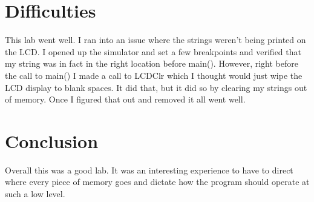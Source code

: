\documentclass[12pt,letterpaper]{article}
\begin{document}
\section{Difficulties}
	This lab went well.
	I ran into an issue where the strings weren't being printed on the LCD.
	I opened up the simulator and set a few breakpoints and verified that my string was in fact in the right location before main().
	However, right before the call to main() I made a call to LCDClr which I thought would just wipe the LCD display to blank spaces.
	It did that, but it did so by clearing my strings out of memory.
	Once I figured that out and removed it all went well.
\section{Conclusion}
	Overall this was a good lab.
	It was an interesting experience to have to direct where every piece of memory goes and dictate how the program should operate at such a low level.
\end{document}
